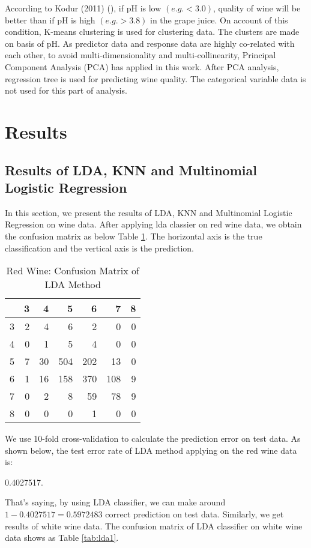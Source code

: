 \documentclass[12pt]{article}
\begin{document}
According to Kodur (2011) (\cite{Kour}), if pH is low $(e.g.<3.0)$, quality of wine will be better than if pH is high
$(e.g.>3.8)$ in the grape juice. On account of this condition, K-means clustering is used for clustering data.
The clusters are made on basis of pH.
As predictor data and response data are highly co-related with each other, to avoid multi-dimensionality and
multi-collinearity, Principal Component Analysis (PCA) has applied in this work. After PCA analysis, regression
tree is used for predicting wine quality. The categorical variable data is not used for this part of analysis.



\section{Results}

\subsection{Results of LDA, KNN and Multinomial Logistic Regression}
In this section, we present the results of LDA, KNN and Multinomial Logistic Regression on wine data.
After applying lda classier on red wine data, we obtain the confusion matrix as below Table \ref{tab:lda0}. The horizontal axis is the true classification and the vertical axis is the prediction. 
\begin{center}
\begin{table}[htbp]
\centering
\begin{tabular}{rrrrrrr}
  \hline
 & 3 & 4 & 5 & 6 & 7 & 8 \\
  \hline
3 &   2 &   4 &   6 &   2 &   0 &   0 \\
  4 &   0 &   1 &   5 &   4 &   0 &   0 \\
  5 &   7 &  30 & 504 & 202 &  13 &   0 \\
  6 &   1 &  16 & 158 & 370 & 108 &   9 \\
  7 &   0 &   2 &   8 &  59 &  78 &   9 \\
  8 &   0 &   0 &   0 &   1 &   0 &   0 \\
   \hline
\end{tabular}
\caption{Red Wine: Confusion Matrix of LDA Method}
\label{tab:lda0}
\end{table}\end{center}
We use 10-fold cross-validation to calculate the prediction error on test data. As shown below, the test error rate of LDA method applying on the red wine data is:
\begin{Schunk}
\begin{Soutput}
[1] 0.4027517.
\end{Soutput}
\end{Schunk}
That's saying, by using LDA classifier, we can make around $1-0.4027517=0.5972483$ correct prediction on test data.
Similarly, we get results of white wine data. The confusion matrix of LDA classifier on white wine data shows as Table \ref{tab:lda1}.
\end{document}
